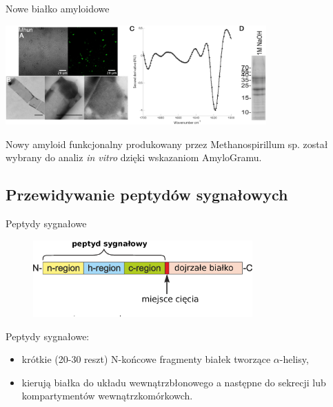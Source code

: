 \documentclass{beamer}\usepackage[]{graphicx}\usepackage[]{color}
\begin{document}
\begin{frame}{Nowe białko amyloidowe}

\includegraphics[width=0.75\textwidth]{static_figure/line.jpg}

Nowy amyloid funkcjonalny produkowany przez Methanospirillum sp. \citep{10.3389/fmicb.2018.02729} został wybrany do analiz \textit{in vitro} dzięki wskazaniom AmyloGramu.

\end{frame}

\subsection{Przewidywanie peptydów sygnałowych}

\begin{frame}{Peptydy sygnałowe}

\begin{figure} 
\includegraphics[width=0.75\textwidth]{static_figure/SP.eps}
\end{figure}

Peptydy sygnałowe:
        \begin{itemize}[<+->]
          \item krótkie (20-30 reszt) N-końcowe fragmenty białek tworzące $\alpha$-helisy,
            \item kierują białka do układu wewnątrzbłonowego a następne do sekrecji lub kompartymentów wewnątrzkomórkowch.
        \end{itemize}
\end{frame}
\end{document}
